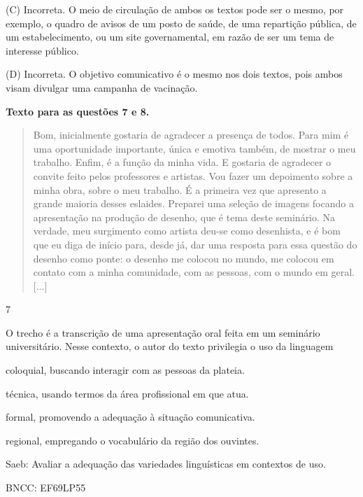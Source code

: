 (C) Incorreta. O meio de circulação de ambos os textos pode ser o mesmo,
por exemplo, o quadro de avisos de um posto de saúde, de uma repartição
pública, de um estabelecimento, ou um site governamental, em razão de
ser um tema de interesse público.

(D) Incorreta. O objetivo comunicativo é o mesmo nos dois textos, pois
ambos visam divulgar uma campanha de vacinação.

\textbf{Texto para as questões 7 e 8.}

\begin{quote}
Bom, inicialmente gostaria de agradecer a presença de todos. Para mim é
uma oportunidade importante, única e emotiva também, de mostrar o meu
trabalho. Enfim, é a função da minha vida. E gostaria de agradecer o
convite feito pelos professores e artistas. Vou fazer um depoimento
sobre a minha obra, sobre o meu trabalho. É a primeira vez que apresento
a grande maioria desses eslaides. Preparei uma seleção de imagens
focando a apresentação na produção de desenho, que é tema deste
seminário. Na verdade, meu surgimento como artista deu-se como
desenhista, e é bom que eu diga de início para, desde já, dar uma
resposta para essa questão do desenho como ponte: o desenho me colocou
no mundo, me colocou em contato com a minha comunidade, com as pessoas,
com o mundo em geral. {[}...{]}
\end{quote}


\num{7}

O trecho é a transcrição de uma apresentação oral feita em um seminário
universitário. Nesse contexto, o autor do texto privilegia o uso da
linguagem

\begin{escolha}
\item
  coloquial, buscando interagir com as pessoas da plateia.
\item
  técnica, usando termos da área profissional em que atua.
\item
  formal, promovendo a adequação à situação comunicativa.
\item
  regional, empregando o vocabulário da região dos ouvintes.
\end{escolha}

Saeb: Avaliar a adequação das variedades linguísticas em contextos de
uso.

BNCC: EF69LP55

